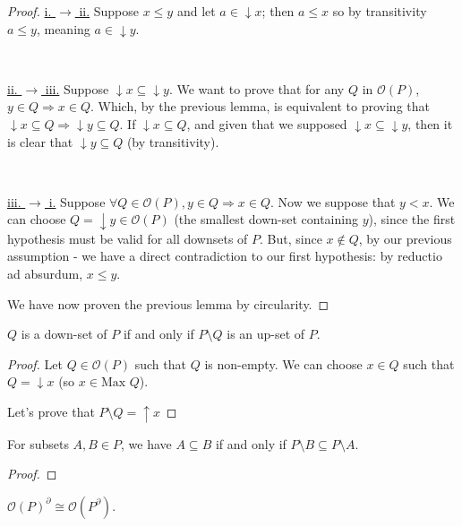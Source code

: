 \begin{proof}
	\underline{i. $\rightarrow$ ii.} Suppose $x \leq y$ and let $a \in \downarrow x$; then $a \leq x$ so by transitivity $a \leq y$, meaning $a \in \downarrow y$.

\

\underline{ii. $\rightarrow$ iii.} Suppose $\downarrow x \subseteq \downarrow y$. We want to prove that for any $Q$ in $\mathcal{O}(P)$, $y \in Q \Rightarrow x \in Q$. Which, by the previous lemma, is equivalent to proving that $\downarrow x \subseteq Q \Rightarrow \downarrow y \subseteq Q$. If $\downarrow x \subseteq Q$, and given that we supposed $\downarrow x \subseteq \downarrow y$, then it is clear that $\downarrow y \subseteq Q$ (by transitivity).

\

\underline{iii. $\rightarrow$ i.} Suppose $\forall Q \in \mathcal{O}(P), y \in Q \Rightarrow x \in Q$. Now we suppose that $y < x$. We can choose $Q = \downarrow y \in \mathcal{O}(P)$ (the smallest down-set containing $y$), since the first hypothesis must be valid for all downsets of $P$. But, since $x \notin  Q$, by our previous assumption - we have a direct contradiction to our first hypothesis: by reductio ad absurdum, $x \leq y$.

We have now proven the previous lemma by circularity.
\end{proof}

\begin{lemma}
    $Q$ is a down-set of $P$ if and only if $P \setminus Q$ is an up-set of $P$.
\end{lemma}

\begin{proof}
  Let $Q \in \mathcal{O}(P)$ such that $Q$ is non-empty. We can choose $x \in Q$ such that $Q = \downarrow x$ (so $x \in \text{Max } Q$).

  Let's prove that $P \setminus Q = \uparrow x$


\end{proof}

\begin{lemma}
  For subsets $A,B \in P$, we have $A \subseteq B$ if and only if $P \setminus B \subseteq P \setminus A$.
\end{lemma}

\begin{proof}

\end{proof}

\begin{prop}
  $\mathcal{O}(P)^{\partial} \cong \mathcal{O}(P^{\partial})$.
\end{prop}

